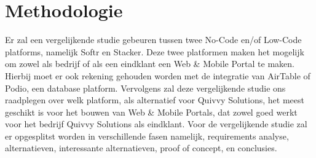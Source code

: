 






\section{Methodologie}%
\label{sec:methodologie}
Er zal een vergelijkende studie gebeuren tussen twee No-Code en/of Low-Code platforms, namelijk Softr en Stacker.
Deze twee platformen maken het mogelijk om zowel als bedrijf of als een eindklant een Web \& Mobile Portal te maken.
Hierbij moet er ook rekening gehouden worden met de integratie van AirTable of Podio, een database platform. 
Vervolgens zal deze vergelijkende studie ons raadplegen over welk platform, als alternatief voor Quivvy Solutions, het meest geschikt is voor het bouwen van Web \& Mobile Portals,
dat zowel goed werkt voor het bedrijf Quivvy Solutions als eindklant. Voor de vergelijkende studie zal er opgesplitst worden in verschillende fasen namelijk,
requirements analyse, alternatieven, interessante alternatieven, proof of concept, en conclusies.
